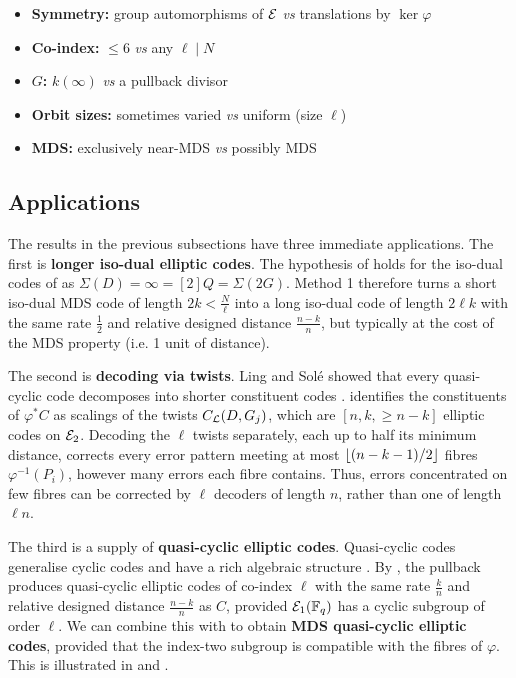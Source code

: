 \documentclass[twocolumn, 11pt]{scrartcl}
\begin{document}
\begin{itemize}[itemsep=-10pt]
    \item \textbf{Symmetry:} group automorphisms of $\mathcal{E}$ \textit{vs} translations by $\ker\varphi$
    \item \textbf{Co-index:} $\leq 6$ \textit{vs} any $\ell\mid N$
    \item \textbf{$G$:} $k(\infty)$ \textit{vs} a pullback divisor
    \item \textbf{Orbit sizes:} sometimes varied \textit{vs} uniform (size $\ell$)
    \item \textbf{MDS:} exclusively near-MDS \textit{vs} possibly MDS
\end{itemize}

\subsection{Applications}

The results in the previous subsections have three immediate applications. The first is \textbf{longer iso-dual elliptic codes}. The hypothesis of  holds for the iso-dual codes of  as $\Sigma(D)=\infty=[2]Q=\Sigma(2G)$. Method 1 therefore turns a short iso-dual MDS code of length $2k<\frac N\ell$ into a long iso-dual code of length $2\ell k$ with the same rate $\frac12$ and relative designed distance $\frac{n-k}{n}$, but typically at the cost of the MDS property (i.e. 1 unit of distance).

The second is \textbf{decoding via twists}. Ling and Sol\'e showed that every quasi-cyclic code decomposes into shorter constituent codes \cite{ling2001algebraic}.  identifies the constituents of $\varphi^*C$ as scalings of the twists $C_\mathcal{L}(D,G_j)$, which are $[n,k,\geq\! n-k]$ elliptic codes on $\mathcal{E}_2$. Decoding the $\ell$ twists separately, each up to half its minimum distance, corrects every error pattern meeting at most $\lfloor(n-k-1)/2\rfloor$ fibres $\varphi^{-1}(P_i)$, however many errors each fibre contains. Thus, errors concentrated on few fibres can be corrected by $\ell$ decoders of length $n$, rather than one of length $\ell n$.

The third is a supply of \textbf{quasi-cyclic elliptic codes}. Quasi-cyclic codes generalise cyclic codes and have a rich algebraic structure \cite{ling2001algebraic}. By , the pullback produces quasi-cyclic elliptic codes of co-index $\ell$ with the same rate $\frac kn$ and relative designed distance $\frac{n-k}{n}$ as $C$, provided $\mathcal{E}_1(\mathbb{F}_q)$ has a cyclic subgroup of order $\ell$. We can combine this with  to obtain \textbf{MDS quasi-cyclic elliptic codes}, provided that the index-two subgroup is compatible with the fibres of $\varphi$. This is illustrated in  and .
\end{document}
